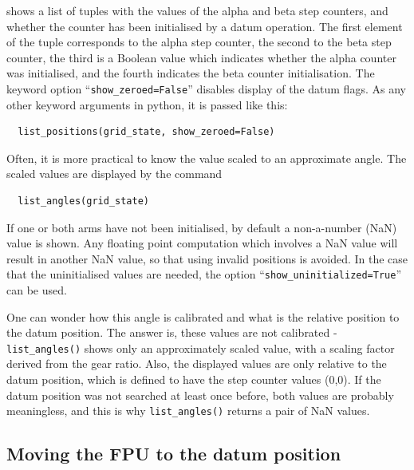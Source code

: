 \documentclass[11pt,a4paper]{report}
\begin{document}
shows a list of tuples with the values of the alpha and beta step
counters, and whether the counter has been initialised by a datum
operation. The first element of the tuple corresponds to the alpha
step counter, the second to the beta step counter, the third is a
Boolean value which indicates whether the alpha counter was
initialised, and the fourth indicates the beta counter
initialisation. The keyword option ``\texttt{show\_zeroed=False}''
disables display of the datum flags.  As any other keyword arguments
in python, it is passed like this:

\begin{verbatim}
  list_positions(grid_state, show_zeroed=False)
\end{verbatim}



Often, it is more practical to know the value scaled to an approximate
angle. The scaled values are displayed by the command
\begin{verbatim}
  list_angles(grid_state)
\end{verbatim}

If one or both arms have not been initialised, by default a
non-a-number (NaN) value is shown. Any floating point computation
which involves a NaN value will result in another NaN value, so that
using invalid positions is avoided.  In the case that the
uninitialised values are needed, the option
``\texttt{show\_uninitialized=True}'' can be used.


One can wonder how this angle is calibrated and what is the relative
position to the datum position. The answer is, these values are not
calibrated - \texttt{list\_angles()} shows only an approximately
scaled value, with a scaling factor derived from the gear ratio.
Also, the displayed values are only relative to the datum position,
which is defined to have the step counter values (0,0). If the datum
position was not searched at least once before, both values are
probably meaningless, and this is why \texttt{list\_angles()} returns
a pair of NaN values.




\subsection{Moving the FPU to the datum position}
\end{document}
